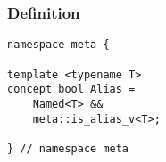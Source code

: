 
\subsubsection{Definition}

\begin{verbatim}
namespace meta {

template <typename T>
concept bool Alias =
	Named<T> &&
	meta::is_alias_v<T>;

} // namespace meta
\end{verbatim}
